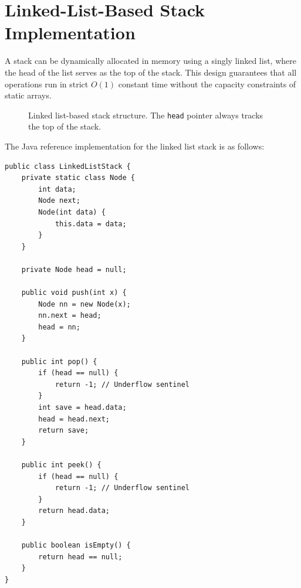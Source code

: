 \documentclass[10pt,journal,compsoc,onecolumn]{IEEEtran}
\begin{document}
\section{Linked-List-Based Stack Implementation}
\label{sec:linked_list}
A stack can be dynamically allocated in memory using a singly linked list, where the head of the list serves as the top of the stack. This design guarantees that all operations run in strict $O(1)$ constant time without the capacity constraints of static arrays.

\begin{figure}[htbp]
\centering
{}
\caption{Linked list-based stack structure. The \texttt{head} pointer always tracks the top of the stack.}
\label{fig:linked_list_stack}
\end{figure}

The Java reference implementation for the linked list stack is as follows:

\begin{verbatim}
public class LinkedListStack {
    private static class Node {
        int data;
        Node next;
        Node(int data) {
            this.data = data;
        }
    }

    private Node head = null;

    public void push(int x) {
        Node nn = new Node(x);
        nn.next = head;
        head = nn;
    }

    public int pop() {
        if (head == null) {
            return -1; // Underflow sentinel
        }
        int save = head.data;
        head = head.next;
        return save;
    }

    public int peek() {
        if (head == null) {
            return -1; // Underflow sentinel
        }
        return head.data;
    }

    public boolean isEmpty() {
        return head == null;
    }
}
\end{verbatim}
\end{document}

